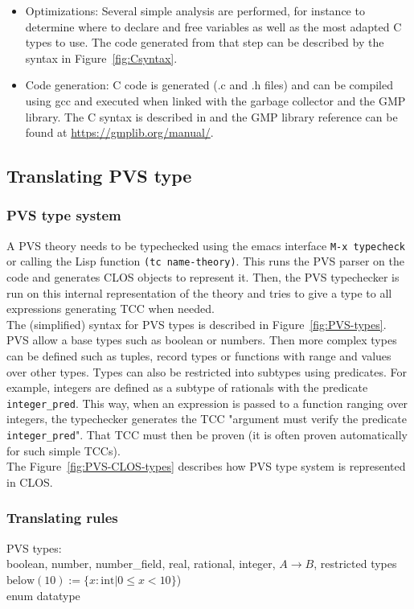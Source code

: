\documentclass[12pt,a4paper]{article}
\newcommand{\cl}[1]{\texttt{#1}}
\begin{document}
\begin{itemize}
\item Optimizations: Several simple analysis are performed, for instance to determine where to declare and free variables as well as the most adapted C types to use. The code generated from that step can be described by the syntax in Figure~\ref{fig:Csyntax}.

\item Code generation: C code is generated (.c and .h files) and can be compiled using gcc and executed when linked with the garbage collector and the GMP library. The C syntax is described in \cite{huss2004c} and the GMP library reference can be found at \href{https://gmplib.org/manual/}{https://gmplib.org/manual/}.
\end{itemize}



\subsection{Translating PVS type}


\subsubsection{PVS type system}
A PVS theory needs to be typechecked using the emacs interface \cl{M-x typecheck} or calling the Lisp function \cl{(tc name-theory)}. This runs the PVS parser on the code and generates CLOS objects to represent it. Then, the PVS typechecker is run on this internal representation of the theory and tries to give a type to all expressions generating TCC when needed.\\

The (simplified) syntax for PVS types is described in Figure~\ref{fig:PVS-types}. PVS allow a base types such as boolean or numbers. Then more complex types can be defined such as tuples, record types or functions with range and values over other types. Types can also be restricted into subtypes using predicates. For example, integers are defined as a subtype of rationals with the predicate \cl{integer\_pred}. This way, when an expression is passed to a function ranging over integers, the typechecker generates the TCC "argument must verify the predicate \cl{integer\_pred}". That TCC must then be proven (it is often proven automatically for such simple TCCs). \\

The Figure~\ref{fig:PVS-CLOS-types} describes how PVS type system is represented in CLOS. 


\subsubsection{Translating rules}
PVS types:\\
boolean, number, number\_field, real, 
rational, integer, $A \rightarrow B$, restricted types
$\text{below}(10) := \{ x:\text{int} | 0 \leq x < 10 \} $)  \\
enum
datatype
\end{document}
